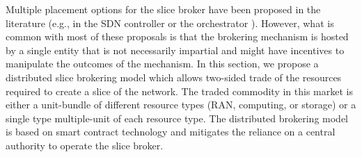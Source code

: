

Multiple placement options for the slice broker have been proposed in the literature (e.g., in the SDN controller \cite{7794896} or the orchestrator \cite{7514161}). However, what is common with most of these proposals is that the brokering mechanism is hosted by a single entity that is not necessarily impartial and might have incentives to manipulate the outcomes of the mechanism. In this section, we propose a distributed slice brokering model which allows two-sided trade of the resources required to create a slice of the network. The traded commodity in this market is either a unit-bundle of different resource types (\ac{RAN}, computing, or storage) or a single type multiple-unit of each resource type. The distributed brokering model is based on smart contract technology and mitigates the reliance on a central authority to operate the slice broker.


